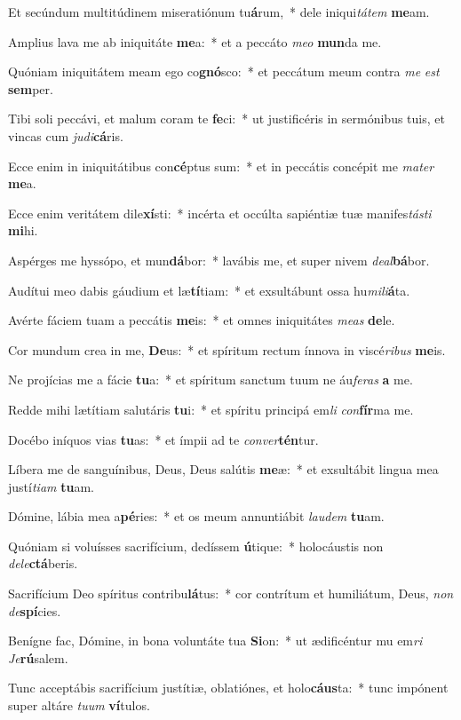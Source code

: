 \item Et secúndum multitúdinem miseratiónum tu\textbf{á}rum,~* dele iniqui\textit{tátem} \textbf{me}am.
\item Amplius lava me ab iniquitáte \textbf{me}a:~* et a peccáto \textit{meo} \textbf{mun}da me.
\item Quóniam iniquitátem meam ego co\textbf{gnó}sco:~* et peccátum meum contra \textit{me} \textit{est} \textbf{sem}per.
\item Tibi soli peccávi, et malum coram te \textbf{fe}ci:~* ut justificéris in sermónibus tuis, et vincas cum \textit{judi}\textbf{cá}ris.
\item Ecce enim in iniquitátibus con\textbf{cé}ptus sum:~* et in peccátis concépit me \textit{mater} \textbf{me}a.
\item Ecce enim veritátem dile\textbf{xí}sti:~* incérta et occúlta sapiéntiæ tuæ manifes\textit{tásti} \textbf{mi}hi.
\item Aspérges me hyssópo, et mun\textbf{dá}bor:~* lavábis me, et super nivem \textit{deal}\textbf{bá}bor.
\item Audítui meo dabis gáudium et læ\textbf{tí}tiam:~* et exsultábunt ossa hu\textit{mili}\textbf{á}ta.
\item Avérte fáciem tuam a peccátis \textbf{me}is:~* et omnes iniquitátes \textit{meas} \textbf{de}le.
\item Cor mundum crea in me, \textbf{De}us:~* et spíritum rectum ínnova in viscé\textit{ribus} \textbf{me}is.
\item Ne projícias me a fácie \textbf{tu}a:~* et spíritum sanctum tuum ne áu\textit{feras} \textbf{a} me.
\item Redde mihi lætítiam salutáris \textbf{tu}i:~* et spíritu principá em\textit{li} \textit{con}\textbf{fír}ma me.
\item Docébo iníquos vias \textbf{tu}as:~* et ímpii ad te \textit{conver}\textbf{tén}tur.
\item Líbera me de sanguínibus, Deus, Deus salútis \textbf{me}æ:~* et exsultábit lingua mea justí\textit{tiam} \textbf{tu}am.
\item Dómine, lábia mea a\textbf{pé}ries:~* et os meum annuntiábit \textit{laudem} \textbf{tu}am.
\item Quóniam si voluísses sacrifícium, dedíssem \textbf{ú}tique:~* holocáustis non \textit{dele}\textbf{ctá}beris.
\item Sacrifícium Deo spíritus contribu\textbf{lá}tus:~* cor contrítum et humiliátum, Deus, \textit{non} \textit{de}\textbf{spí}cies.
\item Benígne fac, Dómine, in bona voluntáte tua \textbf{Si}on:~* ut ædificéntur mu em\textit{ri} \textit{Je}\textbf{rú}salem.
\item Tunc acceptábis sacrifícium justítiæ, oblatiónes, et holo\textbf{cáus}ta:~* tunc impónent super altáre \textit{tuum} \textbf{ví}tulos.
